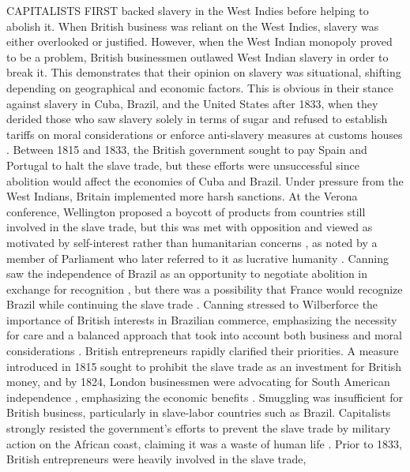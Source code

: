 CAPITALISTS FIRST backed slavery in the West Indies before helping to abolish it. When British business was reliant on the West Indies, slavery was either overlooked or justified. However, when the West Indian monopoly proved to be a problem, British businessmen outlawed West Indian slavery in order to break it. This demonstrates that their opinion on slavery was situational, shifting depending on geographical and economic factors. This is obvious in their stance against slavery in Cuba, Brazil, and the United States after 1833, when they derided those who saw slavery solely in terms of sugar  and refused to establish tariffs on moral considerations or enforce anti-slavery measures at customs houses . Between 1815 and 1833, the British government sought to pay Spain and Portugal to halt the slave trade, but these efforts were unsuccessful since abolition would affect the economies of Cuba and Brazil. Under pressure from the West Indians, Britain implemented more harsh sanctions. At the Verona conference, Wellington proposed a boycott of products from countries still involved in the slave trade, but this was met with opposition and viewed as motivated by self-interest rather than humanitarian concerns , as noted by a member of Parliament who later referred to it as lucrative humanity . Canning saw the independence of Brazil as an opportunity to negotiate abolition in exchange for recognition , but there was a possibility that France would recognize Brazil while continuing the slave trade . Canning stressed to Wilberforce the importance of British interests in Brazilian commerce, emphasizing the necessity for care and a balanced approach that took into account both business and moral considerations . British entrepreneurs rapidly clarified their priorities. A measure introduced in 1815 sought to prohibit the slave trade as an investment for British money, and by 1824, London businessmen were advocating for South American independence , emphasizing the economic benefits . Smuggling was insufficient for British business, particularly in slave-labor countries such as Brazil. Capitalists strongly resisted the government's efforts to prevent the slave trade by military action on the African coast, claiming it was a waste of human life . Prior to 1833, British entrepreneurs were heavily involved in the slave trade, 